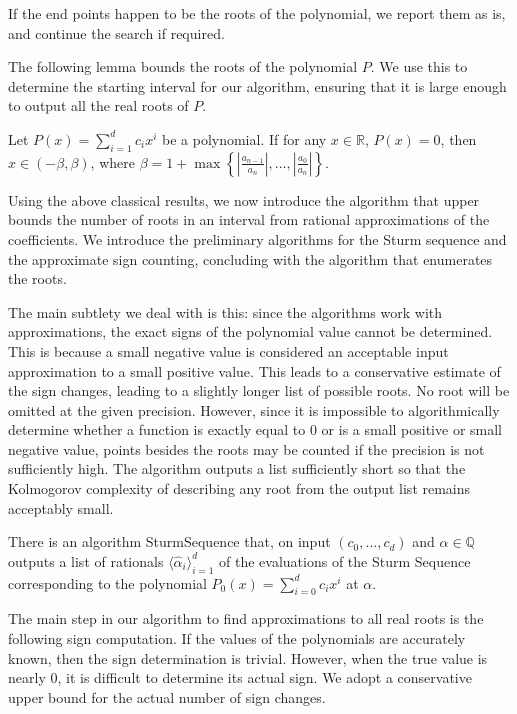 \documentclass[a4paper,UKenglish,cleveref,autoref,thm-restate]{lipics-v2021}
\newcommand{\Q}{\mathbb{Q}}
\newcommand{\R}{\mathbb{R}}
\begin{document}
If the end points happen to be the roots of the polynomial, we report them as is, and continue the search if required.

The following lemma bounds the roots of the polynomial $P$. We use this to determine the starting interval for our algorithm, ensuring that it is large enough to output all the real roots of $P$. 

\begin{lemma}
	Let $P(x)=\sum_{i=1}^d c_ix^i$ be a polynomial. If for any $x \in \R$, $P(x)=0$, then $x\in(-\beta,\beta)$, where $\beta=1+\max \left\{\left|\frac{a_{n-1}}{a_n}\right|,\dots,\left|\frac{a_0}{a_n}\right|\right\}$. 
\end{lemma}

Using the above classical results, we now introduce the algorithm that upper bounds the number of roots in an interval from rational approximations of the coefficients. We introduce the preliminary algorithms for the Sturm sequence and the approximate sign counting, concluding with the algorithm that enumerates the roots. 

The main subtlety we deal with is this: since the algorithms work with approximations, the exact signs of the polynomial value cannot be determined. This is because a small negative value is considered an acceptable input approximation to a small positive value. This leads to a conservative estimate of the sign changes, leading to a slightly longer list of possible roots. No root will be omitted at the given precision. However, since it is impossible to algorithmically determine whether a function is exactly equal to 0 or is a small positive or small negative value, points besides the roots may be counted if the precision is not sufficiently high. The algorithm outputs a list sufficiently short so that the Kolmogorov complexity of describing any root from the output list remains acceptably small. 

\begin{lemma}\label{lem:strumseqeval}
  There is an algorithm SturmSequence that, on input
  $(c_0, \dots, c_d)$ and $\alpha\in\Q$ outputs a list of rationals
  $\langle \hat{\alpha}_i \rangle_{i=1}^d$ of the evaluations of the
  Sturm Sequence corresponding to the polynomial
  $P_0(x)=\sum_{i=0}^d c_i x^i$ at $\alpha$.
\end{lemma}

The main step in our algorithm to find approximations to all real
roots is the following sign computation. If the values of the
polynomials are accurately known, then the sign determination is
trivial. However, when the true value is nearly 0, it is difficult to
determine its actual sign. We adopt a conservative upper bound for the
actual number of sign changes.
\end{document}
